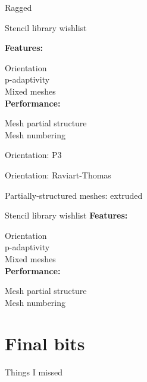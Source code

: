 \documentclass{beamer}
\newcommand{\unchecked}{\makebox[0pt][l]{$\square$}\raisebox{.15ex}{\hspace{0.1em}$\quad$}}
\newcommand{\checked}{\makebox[0pt][l]{$\square$}\raisebox{.15ex}{\hspace{0.1em}$\checkmark$}}
\begin{document}
\begin{frame}{Ragged}

\end{frame}

\begin{frame}{Stencil library wishlist}

  \textbf{Features:}

  \unchecked Orientation \\
  \checked p-adaptivity \\
  \checked Mixed meshes \\

  \textbf{Performance:}

  \unchecked Mesh partial structure \\
  \checked Mesh numbering
\end{frame}

\begin{frame}{Orientation: P3}

\end{frame}

\begin{frame}{Orientation: Raviart-Thomas}

\end{frame}

\begin{frame}{Partially-structured meshes: extruded}

\end{frame}

\begin{frame}{Stencil library wishlist}
  \textbf{Features:}

  \checked Orientation \\
  \checked p-adaptivity \\
  \checked Mixed meshes \\

  \textbf{Performance:}

  \checked Mesh partial structure \\
  \checked Mesh numbering
\end{frame}


\section{Final bits}

\begin{frame}{Things I missed}

\end{frame}
\end{document}
